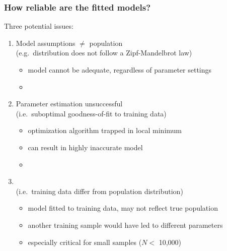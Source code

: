 \documentclass[handout,notes=show,t]{beamer} %
\begin{document}
\begin{frame}
  \frametitle{How reliable are the fitted models?}
  
  Three potential issues:
  \begin{enumerate}
  \item<2-> Model assumptions $\neq$ population\\
    (e.g.\ distribution does not follow a Zipf-Mandelbrot law)
    \begin{itemize}
    \item[\hand] model cannot be adequate, regardless of parameter settings
    \item[]
    \end{itemize}
  \item<3-> Parameter estimation unsuccessful\\
    (i.e.\ suboptimal goodness-of-fit to training data)
    \begin{itemize}
    \item[\hand] optimization algorithm trapped in local minimum
    \item[\hand] can result in highly inaccurate model
    \item[]
    \end{itemize}
  \item<4-> \\
    (i.e.\ training data differ from population distribution)
    \begin{itemize}
    \item[\hand] model fitted to training data, may not reflect true population
    \item[\hand] another training sample would have led to different parameters
    \item[\hand] especially critical for small samples ($N < $ 10,000)
    \end{itemize}
  \end{enumerate}
\end{frame}
\end{document}
